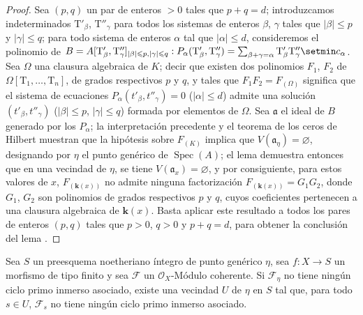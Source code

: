 \begin{proof}
Sea $(p,q)$ un par de enteros $>0$ tales que $p+q=d$; introduzcamos indeterminados $\mathrm T'_\beta$, $\mathrm T''_\gamma$ para todos los sistemas de enteros $\beta$, $\gamma$ tales que $|\beta|\leqslant p$ y $|\gamma|\leqslant q$; para todo sistema de enteros $\alpha$ tal que $|\alpha|\leqslant d$, consideremos el polinomio de $B=A[\mathrm T'_\beta,\mathrm T''_\gamma]_{|\beta|\leqslant p,
  |\gamma|\leqslant q}:
P_\alpha(\mathrm T'_\beta,\mathrm T''_\gamma)
=\sum_{\beta+\gamma=\alpha}\mathrm T'_\beta\mathrm T''_\gamma\setmin c_\alpha$.
Sea $\Omega$ una clausura algebraica de $K$; decir que existen dos polinomios $F_1$, $F_2$ de $\Omega[\mathrm T_1,\ldots,\mathrm T_n]$, de grados respectivos $p$ y $q$, y tales que $F_1F_2=F_{(\Omega)}$ significa que el sistema de ecuaciones $P_\alpha(t'_\beta,t''_\gamma)=0$ ($|\alpha|\leqslant d$) admite una solución $(t'_\beta,t''_\gamma)$ ($|\beta|\leqslant p$, $|\gamma|\leqslant q$) formada por elementos de $\Omega$.
Sea $\mathfrak a$ el ideal de $B$ generado por los $P_\alpha$; la interpretación precedente y el teorema de los ceros de Hilbert muestran que la hipótesis sobre $F_{(K)}$ implica que $V(\mathfrak a_\eta)=\varnothing$, designando por $\eta$ el punto genérico de $\operatorname{Spec}(A)$; el lema  demuestra entonces que en una vecindad de $\eta$, se tiene $V(\mathfrak a_x)=\varnothing$, y por consiguiente, para estos valores de $x$, $F_{(\mathbf{k}(x))}$ no admite ninguna factorización $F_{(\mathbf{k}(x))}=G_1G_2$, donde $G_1$, $G_2$ son polinomios de grados respectivos $p$ y $q$, cuyos coeficientes pertenecen a una clausura algebraica de $\boldsymbol{k}(x)$.
Basta aplicar este resultado a todos los pares de enteros $(p,q)$ tales que $p>0$, $q>0$ y $p+q=d$, para obtener la conclusión del lema .
\end{proof}

\begin{proposition}[9.7.6]
\label{IV.9.7.6}
Sea $S$ un preesquema noetheriano íntegro de punto genérico $\eta$, sea $f:X\to S$ un morfismo de tipo finito y sea $\mathcal F$ un $\mathcal O_X$-Módulo coherente.
Si $\mathcal F_\eta$ no tiene ningún ciclo primo inmerso asociado, existe una vecindad $U$ de $\eta$ en $S$ tal que, para todo $s\in U$, $\mathcal F_s$ no tiene ningún ciclo primo inmerso asociado.
\end{proposition}

